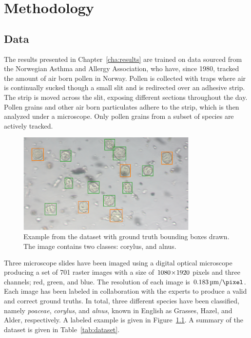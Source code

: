 \chapter{Methodology}\label{cha:method}

\section{Data}\label{sec:dataset}
The results presented in Chapter~\ref{cha:results} are trained on data sourced from the Norwegian Asthma and Allergy Association, who have, since 1980, tracked the amount of air born pollen in Norway.
Pollen is collected with traps where air is continually sucked though a small slit and is redirected over an adhesive strip.
The strip is moved across the slit, exposing different sections throughout the day.
Pollen grains and other air born particulates adhere to the strip, which is then analyzed under a microscope.
Only pollen grains from a subset of species are actively tracked.

\begin{figure}[htbp]
  \centering
  \includegraphics[width=0.8\textwidth]{figs/Snap-057.png}
  \caption[Dataset example]{Example from the dataset with ground truth bounding boxes drawn. The image contains two classes: \textcolor{corylus}{corylus}, and \textcolor{alnus}{alnus}.}\label{fig:dataset-sample}
\end{figure}

Three microscope slides have been imaged using a digital optical microscope producing a set of 701 raster images with a size of \(1080\!\times \! 1920\) pixels and three channels; red, green, and blue.
The resolution of each image is \(\SI{0.183}{\micro\metre\per\pixel}\).
Each image has been labeled in collaboration with the experts to produce a valid and correct ground truths.
In total, three different species have been classified, namely \textit{poaceae}, \textit{corylus}, and \textit{alnus}, known in English as Grasses, Hazel, and Alder, respectively. A labeled example is given in Figure~\ref{fig:dataset-sample}. A summary of the dataset is given in Table~\ref{tab:dataset}.

